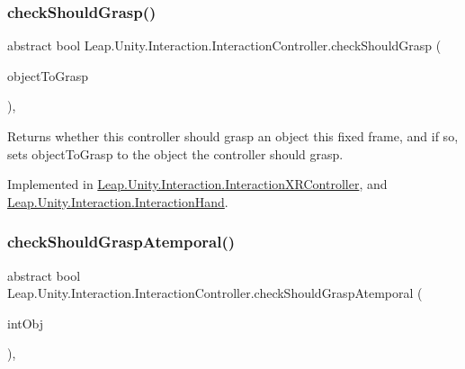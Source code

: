 \subsubsection{\texorpdfstring{checkShouldGrasp()}{checkShouldGrasp()}}
{\footnotesize\ttfamily abstract bool Leap.\+Unity.\+Interaction.\+Interaction\+Controller.\+check\+Should\+Grasp (\begin{DoxyParamCaption}\item[{out \mbox{\hyperlink{interface_leap_1_1_unity_1_1_interaction_1_1_i_interaction_behaviour}{I\+Interaction\+Behaviour}}}]{object\+To\+Grasp }\end{DoxyParamCaption})\hspace{0.3cm}{\ttfamily [protected]}, {}}



Returns whether this controller should grasp an object this fixed frame, and if so, sets object\+To\+Grasp to the object the controller should grasp. 



Implemented in \mbox{\hyperlink{class_leap_1_1_unity_1_1_interaction_1_1_interaction_x_r_controller_aad12f5a78dea6345158e44d87e17a5f6}{Leap.\+Unity.\+Interaction.\+Interaction\+X\+R\+Controller}}, and \mbox{\hyperlink{class_leap_1_1_unity_1_1_interaction_1_1_interaction_hand_ae9cb040d9827bec38bf1c1b3560d7cbb}{Leap.\+Unity.\+Interaction.\+Interaction\+Hand}}.

\mbox{\label{class_leap_1_1_unity_1_1_interaction_1_1_interaction_controller_a99f071b469073deb8265da627e90ad0c}} 
\subsubsection{\texorpdfstring{checkShouldGraspAtemporal()}{checkShouldGraspAtemporal()}}
{\footnotesize\ttfamily abstract bool Leap.\+Unity.\+Interaction.\+Interaction\+Controller.\+check\+Should\+Grasp\+Atemporal (\begin{DoxyParamCaption}\item[{\mbox{\hyperlink{interface_leap_1_1_unity_1_1_interaction_1_1_i_interaction_behaviour}{I\+Interaction\+Behaviour}}}]{int\+Obj }\end{DoxyParamCaption})\hspace{0.3cm}{\ttfamily [protected]}, {}}




